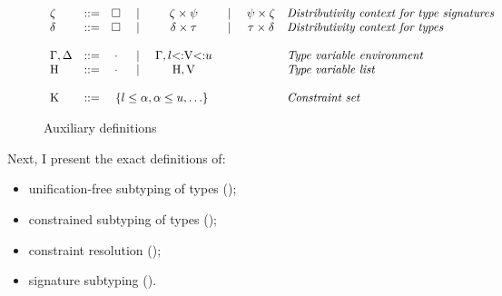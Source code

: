 
\begin{figure}
\footnotesize
\[
\begin{array}{lccccccl}
    \dctxtysig &::=& \square &
        \Alt& \typair{\dctxtysig}{\tysig} &
        \Alt& \typair{\tysig}{\dctxtysig} &
        \textit{Distributivity context for type signatures}
    \\
    \dctxty &::=& \square &
        \Alt& \typair{\dctxty}{\ty} &
        \Alt& \typair{\ty}{\dctxty} &
        \textit{Distributivity context for types}
    \\
    \\
    \AEnv, \UEnv &::=& \EmptyEnv &
        \Alt& \AEnv, \varbound{\vany}{\tylb}{\tyub} &
        & & 
        \textit{Type variable environment}
    \\
    \UEnvD &::=& \EmptyEnv &
        \Alt& \UEnvD, \vany &
        & & 
        \textit{Type variable list}
    \\
    \\
    \CSet &::=& \multicolumn{3}{c}{
            \ctrset{\ctrsub{\tylb}{\va}, \ctrsub{\va}{\tyub}, \ldots}
        } & & &
        \textit{Constraint set}
\end{array}
\]
\caption{Auxiliary definitions}\label{fig:subty-aux}
\end{figure}


Next, I present the exact definitions of:
\begin{itemize}
    \item unification-free subtyping of types 
        ();
    \item constrained subtyping of types 
        ();
    \item constraint resolution \solvectrdflt 
        ();
    \item signature subtyping 
        ().
\end{itemize}


